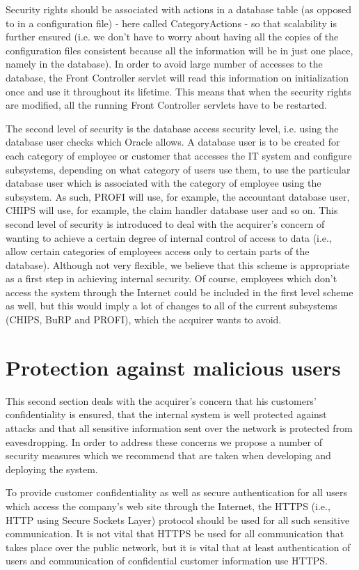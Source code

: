 Security rights should be associated with actions in a database table (as opposed to in a configuration file) - here called
CategoryActions - so that scalability is further ensured (i.e. we don't have to worry about having all the copies of the
configuration files consistent because all the information will be in just one place, namely in the database). In order
to avoid large number of accesses to the database, the Front Controller servlet will read this information on initialization
once and use it throughout its lifetime. This means that when the security rights are modified, all the running Front
Controller servlets have to be restarted.

The second level of security is the database access security level, i.e. using the database user checks which Oracle allows.
A database user is to be created for each category of employee or customer that accesses the IT system and configure
subsystems, depending on what category of users use them, to use the particular database user which is associated
with the category of employee using the subsystem. As such, PROFI will use, for example, the accountant database user,
CHIPS will use, for example, the claim handler database user and so on. This second level of security is introduced to deal
with the acquirer's concern of wanting to achieve a certain degree of internal control of access to data (i.e., allow certain
categories of employees access only to certain parts of the database). Although not very flexible, we believe that this scheme
is appropriate as a first step in achieving internal security. Of course, employees which don't access the system through
the Internet could be included in the first level scheme as well, but this would imply a lot of changes to all of the current
subsystems (CHIPS, BuRP and PROFI), which the acquirer wants to avoid.

\section{Protection against malicious users}

This second section deals with the acquirer's concern that his customers' confidentiality is ensured, that the internal system
is well protected against attacks and that all sensitive information sent over the network is protected from eavesdropping.
In order to address these concerns we propose a number of security measures which we recommend that are taken when
developing and deploying the system.

To provide customer confidentiality as well as secure authentication for all users which access the company's web site
through the Internet, the HTTPS (i.e., HTTP using Secure Sockets Layer) protocol should be used for all such sensitive
communication. It is not vital that HTTPS be used for all communication that takes place over the public network, but it
is vital that at least authentication of users and communication of confidential customer information use HTTPS.

